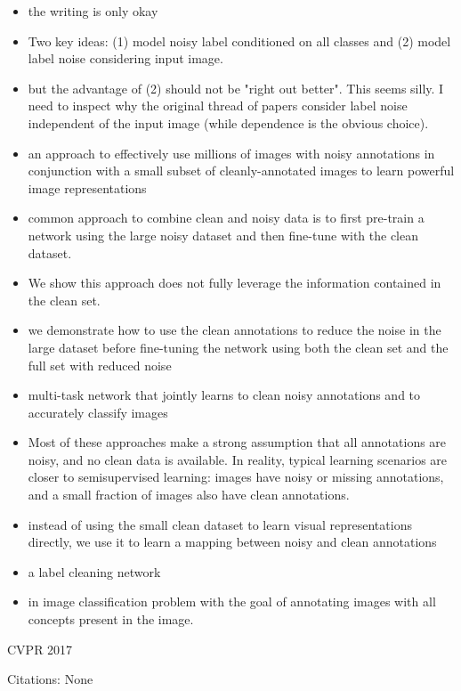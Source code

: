 \documentclass[11pt]{article}
\begin{document}
\begin{itemize}
\item the writing is only okay
\item Two key ideas: (1) model noisy label conditioned on all classes and (2) model label noise considering input image.
\item but the advantage of (2) should not be "right out better". This seems silly. I need to inspect why the original thread of papers consider label noise independent of the input image (while dependence is the obvious choice).
\item an approach to effectively use millions of images with noisy annotations in conjunction with a small
subset of cleanly-annotated images to learn powerful image
representations
\item  common approach to combine clean
and noisy data is to first pre-train a network using the large
noisy dataset and then fine-tune with the clean dataset.
\item We
show this approach does not fully leverage the information
contained in the clean set.
\item we demonstrate how to
use the clean annotations to reduce the noise in the large
dataset before fine-tuning the network using both the clean
set and the full set with reduced noise
\item multi-task network that jointly learns to clean noisy
annotations and to accurately classify images
\item Most of these approaches make a strong assumption that
all annotations are noisy, and no clean data is available.
In reality, typical learning scenarios are closer to semisupervised learning: images have noisy or missing annotations, and a small fraction of images also have clean annotations. 
\item instead of using the small
clean dataset to learn visual representations directly, we use
it to learn a mapping between noisy and clean annotations
\item a label cleaning network
\item in image classification problem with the goal of annotating images with all concepts
present in the image. 
\end{itemize}

\vspace{2cm}

\noindent CVPR 2017

\noindent Citations: None
\end{document}
